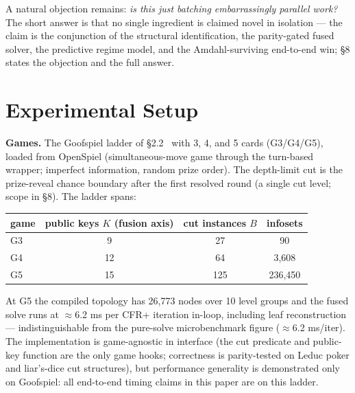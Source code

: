 \documentclass[11pt]{article}
\begin{document}
A natural objection remains: \emph{is this just batching embarrassingly parallel work?}
The short answer is that no single ingredient is claimed novel in isolation --- the
claim is the conjunction of the structural identification, the parity-gated fused
solver, the predictive regime model, and the Amdahl-surviving end-to-end win; \S8 states
the objection and the full answer.

\section{Experimental Setup}

\textbf{Games.} The Goofspiel ladder of \S2.2~\citep{Ross1971} with 3, 4, and 5 cards
(G3/G4/G5), loaded from OpenSpiel (simultaneous-move game through the turn-based
wrapper; imperfect information, random prize order). The depth-limit cut is the
prize-reveal chance boundary after the first resolved round (a single cut level; scope
in \S8). The ladder spans:

\begin{center}
\begin{tabular}{lccc}
\toprule
game & public keys $K$ (fusion axis) & cut instances $B$ & infosets \\
\midrule
G3 & 9 & 27 & 90 \\
G4 & 12 & 64 & 3,608 \\
G5 & 15 & 125 & 236,450 \\
\bottomrule
\end{tabular}
\end{center}

At G5 the compiled topology has 26,773 nodes over 10 level groups and the fused solve
runs at $\approx$6.2 ms per CFR+ iteration in-loop, including leaf reconstruction ---
indistinguishable from the pure-solve microbenchmark figure ($\approx$6.2 ms/iter). The
implementation is game-agnostic in interface (the cut predicate and public-key function
are the only game hooks; correctness is parity-tested on Leduc poker and liar's-dice cut
structures), but performance generality is demonstrated only on Goofspiel: all
end-to-end timing claims in this paper are on this ladder.
\end{document}
